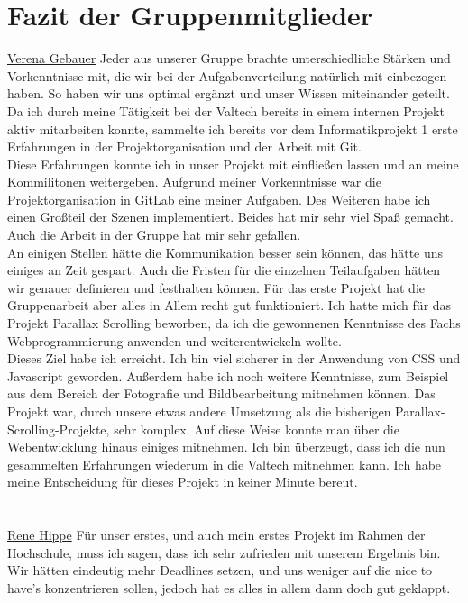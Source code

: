 \section{Fazit der Gruppenmitglieder}
\underline{Verena Gebauer}
Jeder aus unserer Gruppe brachte unterschiedliche Stärken und Vorkenntnisse mit, die wir bei der Aufgabenverteilung natürlich mit einbezogen haben. So haben wir uns optimal ergänzt und unser Wissen miteinander geteilt. \\
Da ich durch meine Tätigkeit bei der Valtech bereits in einem internen Projekt aktiv mitarbeiten konnte, sammelte ich bereits vor dem Informatikprojekt 1 erste Erfahrungen in der Projektorganisation und der Arbeit mit Git.\\
Diese Erfahrungen konnte ich in unser Projekt mit einfließen lassen und an meine Kommilitonen weitergeben.
Aufgrund meiner Vorkenntnisse war die Projektorganisation in GitLab eine meiner Aufgaben. Des Weiteren habe ich einen Großteil der Szenen implementiert. Beides hat mir sehr viel Spaß gemacht. Auch die Arbeit in der Gruppe hat mir sehr gefallen. \\
An einigen Stellen hätte die Kommunikation besser sein können, das hätte uns einiges an Zeit gespart. Auch die Fristen für die einzelnen Teilaufgaben hätten wir genauer definieren und festhalten können.
Für das erste Projekt hat die Gruppenarbeit aber alles in Allem recht gut funktioniert.
Ich hatte mich für das Projekt Parallax Scrolling beworben, da ich die gewonnenen Kenntnisse des Fachs Webprogrammierung anwenden und weiterentwickeln wollte. \\
Dieses Ziel habe ich erreicht. Ich bin viel sicherer in der Anwendung von CSS und Javascript geworden. Außerdem habe ich noch weitere Kenntnisse, zum Beispiel aus dem Bereich der Fotografie und Bildbearbeitung mitnehmen können. Das Projekt war, durch unsere etwas andere Umsetzung als die bisherigen Parallax-Scrolling-Projekte, sehr komplex. Auf diese Weise konnte man über die Webentwicklung hinaus einiges mitnehmen. Ich bin überzeugt, dass ich die nun gesammelten Erfahrungen wiederum in die Valtech mitnehmen kann. Ich habe meine Entscheidung für dieses Projekt in keiner Minute bereut.\\
\\
\\
\underline{Rene Hippe}
Für unser erstes, und auch mein erstes Projekt im Rahmen der Hochschule, muss ich sagen, dass ich sehr zufrieden mit unserem Ergebnis bin. Wir hätten eindeutig mehr Deadlines setzen, und uns weniger auf die nice to have’s konzentrieren sollen, jedoch hat es alles in allem dann doch gut geklappt.\\
